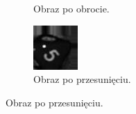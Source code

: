\begin{figure}[h]
\begin{subfigure}[t]{0.32\linewidth}
        \caption{Obraz po obrocie.}
        \label{fig:5rotate}
    \end{subfigure}
    \hfill
    \begin{subfigure}[t]{0.32\linewidth}
        \centering
        \includegraphics[width=\linewidth]{chapters/04-czytanie/figures/5_shift}
        \caption{Obraz po przesunięciu.}
        \label{fig:5move}
    \end{subfigure}

    \vspace{0.5cm} %


\end{figure}
